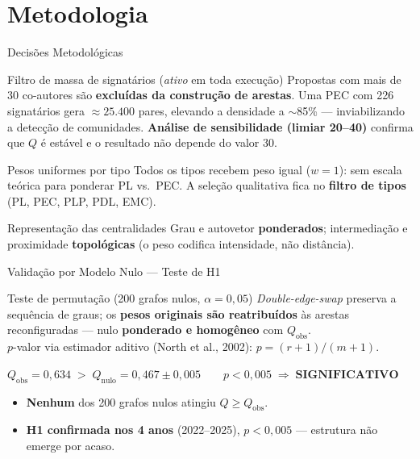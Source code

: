 \documentclass{beamer}
\begin{document}
\section{Metodologia}

\begin{frame}{Decisões Metodológicas}
\begin{block}{Filtro de massa de signatários (\textit{ativo} em toda execução)}
Propostas com mais de 30 co-autores são \textbf{excluídas da construção de arestas}. Uma PEC com 226 signatários gera $\approx 25.400$ pares, elevando a densidade a $\sim$85\% — inviabilizando a detecção de comunidades. \textbf{Análise de sensibilidade (limiar 20--40)} confirma que $Q$ é estável e o resultado não depende do valor 30.
\end{block}

\begin{block}{Pesos uniformes por tipo}
Todos os tipos recebem peso igual ($w=1$): sem escala teórica para ponderar PL vs.\ PEC. A seleção qualitativa fica no \textbf{filtro de tipos} (PL, PEC, PLP, PDL, EMC).
\end{block}

\begin{block}{Representação das centralidades}
Grau e autovetor \textbf{ponderados}; intermediação e proximidade \textbf{topológicas} (o peso codifica intensidade, não distância).
\end{block}
\end{frame}

\begin{frame}{Validação por Modelo Nulo — Teste de H1}
\begin{block}{Teste de permutação (200 grafos nulos, $\alpha = 0{,}05$)}
\textit{Double-edge-swap} preserva a sequência de graus; os \textbf{pesos originais são reatribuídos} às arestas reconfiguradas — nulo \textbf{ponderado e homogêneo} com $Q_{\text{obs}}$. \\
$p$-valor via estimador aditivo (North et al., 2002): $p = (r+1)/(m+1)$.
\end{block}

\vspace{0.2cm}
\begin{center}
$Q_{\text{obs}} = 0{,}634 \;>\; Q_{\text{nulo}} = 0{,}467 \pm 0{,}005 \qquad p < 0{,}005 \;\Rightarrow\; \textbf{SIGNIFICATIVO}$
\end{center}
\vspace{0.2cm}

\begin{itemize}\footnotesize
  \item \textbf{Nenhum} dos 200 grafos nulos atingiu $Q \geq Q_{\text{obs}}$.
  \item \textbf{H1 confirmada nos 4 anos} (2022--2025), $p < 0{,}005$ — estrutura não emerge por acaso.
\end{itemize}
\end{frame}
\end{document}
